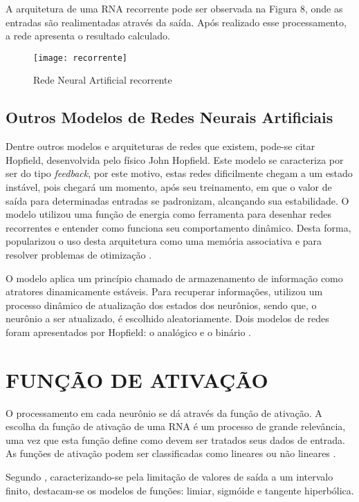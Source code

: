 A arquitetura de uma RNA recorrente pode ser observada na Figura 8, onde as entradas são realimentadas através da saída. Após realizado esse processamento, a rede apresenta o resultado calculado.

\begin{figure}[h]
	\centering
	\texttt{[image: recorrente]}
	\caption{Rede Neural Artificial recorrente}
	\label{fig-recorrente}
\end{figure}

\subsection{Outros Modelos de Redes Neurais Artificiais}
Dentre outros modelos e arquiteturas de redes que existem, pode-se citar Hopfield, desenvolvida pelo físico John Hopfield. Este modelo se caracteriza por ser do tipo \textit{feedback}, por este motivo, estas redes dificilmente chegam a um estado instável, pois chegará um momento, após seu treinamento, em que o valor de saída para determinadas entradas se padronizam, alcançando sua estabilidade. O modelo utilizou uma função de energia como ferramenta para desenhar redes recorrentes e entender como funciona seu comportamento dinâmico. Desta forma, popularizou o uso desta arquitetura como uma memória associativa e para resolver problemas de otimização \cite{cardon}.

O modelo aplica um princípio chamado de armazenamento de informação como atratores dinamicamente estáveis. Para recuperar informações, utilizou um processo dinâmico de atualização dos estados dos neurônios, sendo que, o neurônio a ser atualizado, é escolhido aleatoriamente. Dois modelos de redes foram apresentados por Hopfield: o analógico e o binário \cite{silva}.

\section{FUNÇÃO DE ATIVAÇÃO}\label{sec:funcao-ativacao}
O processamento em cada neurônio se dá através da função de ativação. A escolha da função de ativação de uma RNA é um processo de grande relevância, uma vez que esta função define como devem ser tratados seus dados de entrada. As funções de ativação podem ser classificadas como lineares ou não lineares \cite{haykin2000}.

Segundo , caracterizando-se pela limitação de valores de saída a um intervalo finito, destacam-se os modelos de funções: limiar, sigmóide e tangente hiperbólica.


